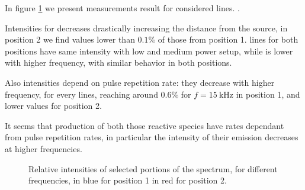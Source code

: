 In figure \ref{fig:irel} we present measurements result for considered lines. .

Intensities for  decreases drastically increasing the distance from the source, in position 2 we find values lower than $0.1\%$ of those from position 1.  lines for both positions have same intensity with low and medium power setup, while is lower with higher frequency, with similar behavior in both positions.

Also  intensities depend on pulse repetition rate: they decrease with higher frequency, for every lines, reaching around $0.6\%$ for $f = \SI{15}{\kilo\hertz}$ in position 1, and lower values for position 2.

It seems that production of both those reactive species have rates dependant from pulse repetition rates, in particular the intensity of their emission decreases at higher frequencies.
\begin{figure}
\centering
 \hspace{0.55\textwidth}
 \hfill
 \caption{Relative intensities of selected portions of the spectrum, for different frequencies, in blue for position 1 in red for position 2.}
 \label{fig:irel}
\end{figure}


